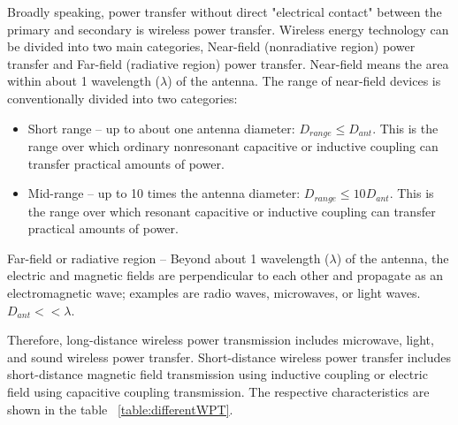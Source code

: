 Broadly speaking, power transfer without direct "electrical contact" between the primary and secondary is wireless power transfer. Wireless energy technology can be divided into two main categories, Near-field (nonradiative region) power transfer and Far-field (radiative region) power transfer. 
Near-field means the area within about 1 wavelength ($\lambda$) of the antenna.  The range of near-field devices is conventionally divided into two categories:
\begin{itemize}
    \item  Short range – up to about one antenna diameter: $D_{range} \leq D_{ant}$. This is the range over which ordinary nonresonant capacitive or inductive coupling can transfer practical amounts of power.
    \item Mid-range – up to 10 times the antenna diameter:  $D_{range} \leq 10 D_{ant}$. This is the range over which resonant capacitive or inductive coupling can transfer practical amounts of power.
\end{itemize} 
Far-field or radiative region – Beyond about 1 wavelength ($\lambda$) of the antenna, the electric and magnetic fields are perpendicular to each other and propagate as an electromagnetic wave; examples are radio waves, microwaves, or light waves.
$D_{ant} << \lambda$.

Therefore, long-distance wireless power transmission includes microwave, light, and sound wireless power transfer. Short-distance wireless power transfer includes short-distance magnetic field transmission using inductive coupling or electric field using capacitive coupling transmission. The respective characteristics are shown in the table ~\ref{table:differentWPT}.

